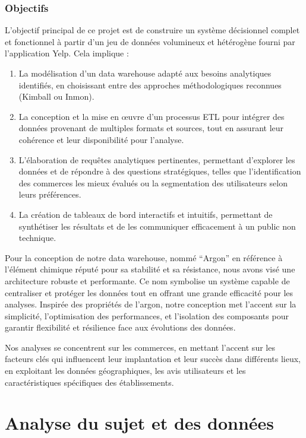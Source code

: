 \subsection*{Objectifs}
L’objectif principal de ce projet est de construire un système décisionnel complet et fonctionnel à partir d’un jeu de données volumineux et hétérogène fourni par l’application Yelp. Cela implique :

\begin{enumerate}
\item La modélisation d’un data warehouse adapté aux besoins analytiques identifiés, en choisissant entre des approches méthodologiques reconnues (Kimball ou Inmon).
\item La conception et la mise en œuvre d’un processus ETL pour intégrer des données provenant de multiples formats et sources, tout en assurant leur cohérence et leur disponibilité pour l’analyse.
\item L’élaboration de requêtes analytiques pertinentes, permettant d'explorer les données et de répondre à des questions stratégiques, telles que l’identification des commerces les mieux évalués ou la segmentation des utilisateurs selon leurs préférences.
\item La création de tableaux de bord interactifs et intuitifs, permettant de synthétiser les résultats et de les communiquer efficacement à un public non technique.
\end{enumerate}

Pour la conception de notre data warehouse, nommé “Argon” en référence à l’élément chimique réputé pour sa stabilité et sa résistance, nous avons visé une architecture robuste et performante. Ce nom symbolise un système capable de centraliser et protéger les données tout en offrant une grande efficacité pour les analyses. Inspirée des propriétés de l’argon, notre conception met l’accent sur la simplicité, l’optimisation des performances, et l’isolation des composants pour garantir flexibilité et résilience face aux évolutions des données. 


Nos analyses se concentrent sur les commerces, en mettant l'accent sur les facteurs clés qui influencent leur implantation et leur succès dans différents lieux, en exploitant les données géographiques, les avis utilisateurs et les caractéristiques spécifiques des établissements.


\chapter*{Analyse du sujet et des données}


